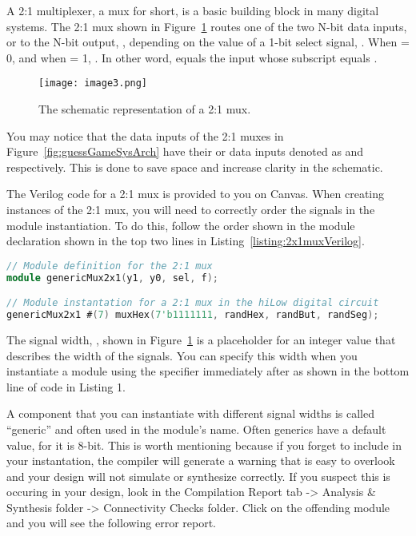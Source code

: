 A 2:1 multiplexer, a mux for short, is a basic building block in many
digital systems. The 2:1 mux shown in Figure~\ref{fig:2x1MuxSymbol}
routes one of the two
N-bit data inputs,  or  to the N-bit output, , depending
on the value of a 1-bit select signal, . When  = 0,
 and when  = 1, . In other word, 
equals the  input whose subscript equals .

\begin{figure}[ht]
    \texttt{[image: image3.png]}
    \caption{The schematic representation of a 2:1 mux.}
    \label{fig:2x1MuxSymbol}
\end{figure}

You may notice that the data inputs of the 2:1 muxes in Figure~\ref{fig:guessGameSysArch}
have
their  or  data
inputs denoted as  and  respectively. This is done to save space
and increase clarity in the schematic.

The Verilog code for a 2:1 mux is provided to you on Canvas. When
creating instances of the 2:1 mux, you will need to correctly order the
signals in the module instantiation. To do this, follow the
order shown in the module declaration shown in the top two lines in
Listing~\ref{listing:2x1muxVerilog}.

\begin{lstlisting}[language=Verilog,
 caption={Top, module definition for a 2:1 mux.  Bottom, module instantation
 of a 2:1 mux in Figure~\ref{fig:guessGameSysArch}.},
 label={listing:2x1muxVerilog},
 frame=single]
// Module definition for the 2:1 mux
module genericMux2x1(y1, y0, sel, f);

// Module instantation for a 2:1 mux in the hiLow digital circuit
genericMux2x1 #(7) muxHex(7'b1111111, randHex, randBut, randSeg);
\end{lstlisting}

The signal width, , shown in Figure~\ref{fig:2x1MuxSymbol} is a
placeholder for an integer value that describes the width of the 
signals.  You can specify this width when you instantiate a  module using the \hdl{\#()}
specifier immediately after  as shown in the bottom line of code in Listing 1.

A component
that you can instantiate with different signal widths is called
``generic'' and often used in the module's name.  Often generics
have a default value, for  it is 8-bit. This is
worth mentioning because if you forget to include  in your
instantation, the compiler will generate a warning that is easy to
overlook and your design will not simulate or synthesize correctly.
If you suspect this is occuring in your design,  look in the Compilation
Report tab -\textgreater{} Analysis \& Synthesis folder -\textgreater{}
Connectivity Checks folder. Click on the offending module and you will
see the following error report.

